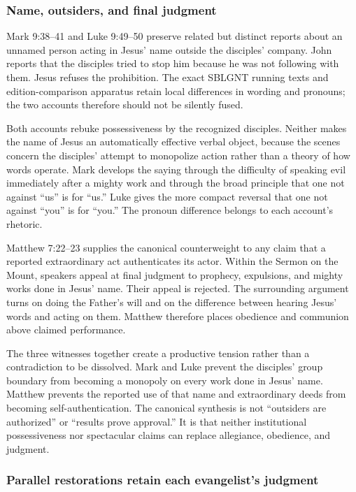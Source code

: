 \subsubsection{Name, outsiders, and final judgment}

Mark 9:38--41 and Luke 9:49--50 preserve related but distinct reports about an
unnamed person acting in Jesus' name outside the disciples' company. John
reports that the disciples tried to stop him because he was not following
with them. Jesus refuses the prohibition. The exact SBLGNT running texts and
edition-comparison apparatus retain local differences in wording and
pronouns; the two accounts therefore should not be silently fused.

Both accounts rebuke possessiveness by the recognized disciples. Neither
makes the name of Jesus an automatically effective verbal object, because the
scenes concern the disciples' attempt to monopolize action rather than a
theory of how words operate. Mark develops the saying through the difficulty
of speaking evil immediately after a mighty work and through the broad
principle that one not against ``us'' is for ``us.'' Luke gives the more
compact reversal that one not against ``you'' is for ``you.'' The pronoun
difference belongs to each account's rhetoric.

Matthew 7:22--23 supplies the canonical counterweight to any claim that a
reported extraordinary act authenticates its actor. Within the Sermon on the
Mount, speakers appeal at final judgment to prophecy, expulsions, and mighty
works done in Jesus' name. Their appeal is rejected. The surrounding argument
turns on doing the Father's will and on the difference between hearing Jesus'
words and acting on them. Matthew therefore places obedience and communion
above claimed performance.

The three witnesses together create a productive tension rather than a
contradiction to be dissolved. Mark and Luke prevent the disciples' group
boundary from becoming a monopoly on every work done in Jesus' name. Matthew
prevents the reported use of that name and extraordinary deeds from becoming
self-authentication. The canonical synthesis is not ``outsiders are
authorized'' or ``results prove approval.'' It is that neither institutional
possessiveness nor spectacular claims can replace allegiance, obedience, and
judgment.

\subsubsection{Parallel restorations retain each evangelist's judgment}

